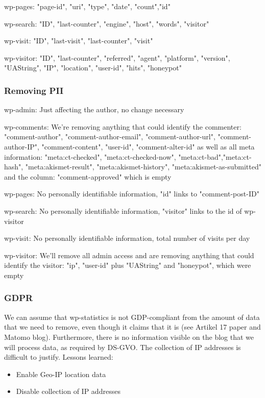 wp-pages: "page-id", "uri", "type", "date", "count","id"

wp-search: "ID", "last-counter", "engine", "host", "words", "visitor"

wp-visit: "ID", "last-visit", "last-counter", "visit"

wp-visitor: "ID", "last-counter", "referred", "agent", "platform", "version", "UAString", "IP", "location", "user-id", "hits", "honeypot"

\subsubsection{Removing PII}

wp-admin: Just affecting the author, no change necessary

wp-comments: We're removing anything that could identify the commenter: "comment-author", "comment-author-email", "comment-author-url", "comment-author-IP", "comment-content", "user-id", "comment-alter-id" as well as all meta information: "meta:ct-checked", "meta:ct-checked-now", "meta:ct-bad","meta:ct-hash", "meta:akismet-result", "meta:akismet-history", "meta:akismet-as-submitted" and the column: "comment-approved" which is empty

wp-pages: No personally identifiable information, "id" links to "comment-post-ID"

wp-search: No personally identifiable information, "visitor" links to the id of wp-visitor

wp-visit: No personally identifiable information, total number of visits per day

wp-visitor: We'll remove all admin access and are removing anything that could identify the visitor: "ip", "user-id" plus "UAString" and "honeypot", which were empty

\subsubsection{GDPR}

We can assume that wp-statistics is not GDP-compliant from the amount of data that we need to remove, even though it claims that it is (see Artikel 17 paper and Matomo blog). Furthermore, there is no information visible on the blog that we will process data, as required by DS-GVO. The collection of IP addresses is difficult to justify. Lessons learned:

\begin{itemize}
 \item Enable Geo-IP location data
 \item Disable collection of IP addresses
\end{itemize}

